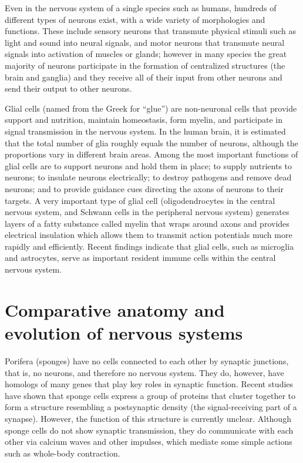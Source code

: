 \documentclass[]{book}
\begin{document}
Even in the nervous system of a single species such as humans, hundreds of different types of neurons exist, with a wide variety of morphologies and functions. These include sensory neurons that transmute physical stimuli such as light and sound into neural signals, and motor neurons that transmute neural signals into activation of muscles or glands; however in many species the great majority of neurons participate in the formation of centralized structures (the brain and ganglia) and they receive all of their input from other neurons and send their output to other neurons.

Glial cells (named from the Greek for ``glue'') are non-neuronal cells that provide support and nutrition, maintain homeostasis, form myelin, and participate in signal transmission in the nervous system. In the human brain, it is estimated that the total number of glia roughly equals the number of neurons, although the proportions vary in different brain areas. Among the most important functions of glial cells are to support neurons and hold them in place; to supply nutrients to neurons; to insulate neurons electrically; to destroy pathogens and remove dead neurons; and to provide guidance cues directing the axons of neurons to their targets. A very important type of glial cell (oligodendrocytes in the central nervous system, and Schwann cells in the peripheral nervous system) generates layers of a fatty substance called myelin that wraps around axons and provides electrical insulation which allows them to transmit action potentials much more rapidly and efficiently. Recent findings indicate that glial cells, such as microglia and astrocytes, serve as important resident immune cells within the central nervous system.

\hypertarget{comparative-anatomy-and-evolution-of-nervous-systems}{%
\section{Comparative anatomy and evolution of nervous systems}\label{comparative-anatomy-and-evolution-of-nervous-systems}}

Porifera (sponges) have no cells connected to each other by synaptic junctions, that is, no neurons, and therefore no nervous system. They do, however, have homologs of many genes that play key roles in synaptic function. Recent studies have shown that sponge cells express a group of proteins that cluster together to form a structure resembling a postsynaptic density (the signal-receiving part of a synapse). However, the function of this structure is currently unclear. Although sponge cells do not show synaptic transmission, they do communicate with each other via calcium waves and other impulses, which mediate some simple actions such as whole-body contraction.
\end{document}
